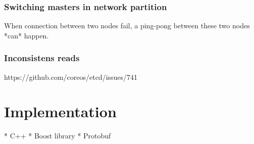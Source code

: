 \subsubsection{Switching masters in network partition}
When connection between two nodes fail, a ping-pong between these two nodes *can* happen.

\subsubsection{Inconsistens reads}
https://github.com/coreos/etcd/issues/741

\section {Implementation}

* C++
* Boost library
* Protobuf



